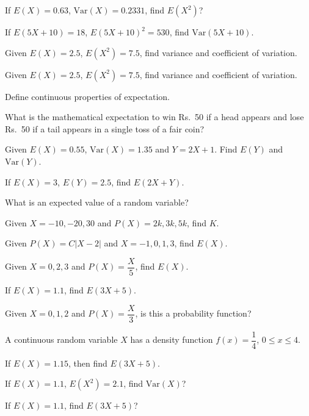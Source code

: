 \documentclass[11pt,a4paper]{article}
\begin{document}
\begin{shortlist}
\item If $E(X)=0.63$, $\mathrm{Var}(X)=0.2331$, find $E(X^2)$?

\item If $E(5X+10)=18$, $E(5X+10)^2=530$, find $\mathrm{Var}(5X+10)$.

\item Given $E(X)=2.5$, $E(X^2)=7.5$, find variance and coefficient of variation.

\item Given $E(X)=2.5$, $E(X^2)=7.5$, find variance and coefficient of variation.

\item Define continuous properties of expectation.

\item What is the mathematical expectation to win Rs.\ 50 if a head appears and lose Rs.\ 50 if a tail appears in a single toss of a fair coin?

\item Given $E(X)=0.55$, $\mathrm{Var}(X)=1.35$ and $Y=2X+1$. Find $E(Y)$ and $\mathrm{Var}(Y)$.

\item If $E(X)=3$, $E(Y)=2.5$, find $E(2X+Y)$.

\item What is an expected value of a random variable?

\item Given $X=-10,-20,30$ and $P(X)=2k,3k,5k$, find $K$.

\item Given $P(X)=C|X-2|$ and $X=-1,0,1,3$, find $E(X)$.

\item Given $X=0,2,3$ and $P(X)=\dfrac{X}{5}$, find $E(X)$.

\item If $E(X)=1.1$, find $E(3X+5)$.

\item Given $X=0,1,2$ and $P(X)=\dfrac{X}{3}$, is this a probability function?

\item A continuous random variable $X$ has a density function $f(x)=\dfrac{1}{4}$, $0\le x \le 4$.

\item If $E(X)=1.15$, then find $E(3X+5)$.

\item If $E(X)=1.1$, $E(X^2)=2.1$, find $\mathrm{Var}(X)$?

\item If $E(X)=1.1$, find $E(3X+5)$?


\end{shortlist}
\end{document}
